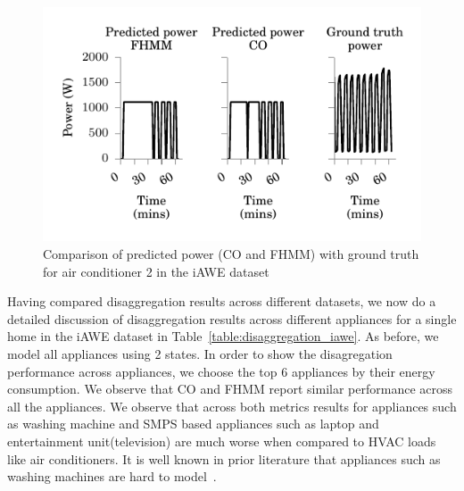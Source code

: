 \documentclass{sig-alternate}
\newcommand{\tabref}[1]{Table~\ref{#1}}
\begin{document}
\begin{figure}
\includegraphics{figures/ac_2.pdf} 
\caption{Comparison of predicted power (CO and FHMM) with ground truth for air conditioner 2 in the iAWE dataset}
\label{fig:ac_disaggregation} 
\end{figure}

\noindent
Having compared disaggregation results across different datasets, we now do a detailed discussion of disaggregation results across different appliances for a single home in the iAWE dataset in \tabref{table:disaggregation_iawe}. As before, we model all appliances using 2 states. In order to show the disagregation performance across appliances, we choose the top 6 appliances by their energy consumption. We observe that CO and FHMM report similar performance across all the appliances. We observe that across both metrics results for appliances such as washing machine and SMPS based appliances such as laptop and entertainment unit(television) are much worse when compared to HVAC loads like air conditioners. It is well known in prior literature that appliances such as washing machines are hard to model~\cite{barker_2013}.
\end{document}
